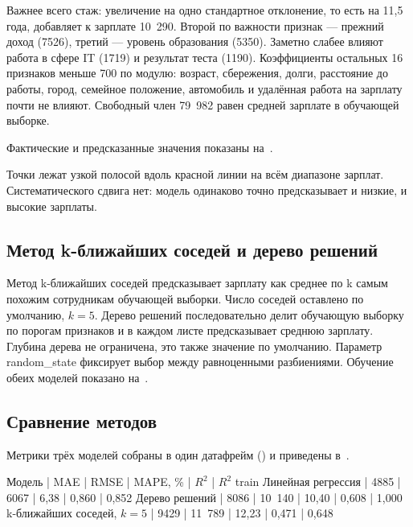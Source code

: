 \documentclass[a4paper,14pt]{extarticle}
\begin{document}
Важнее всего стаж: увеличение на одно стандартное отклонение, то есть на 11,5 года, добавляет к зарплате 10~290. Второй по важности признак — прежний доход (7526), третий — уровень образования (5350). Заметно слабее влияют работа в сфере IT (1719) и результат теста (1190). Коэффициенты остальных 16 признаков меньше 700 по модулю: возраст, сбережения, долги, расстояние до работы, город, семейное положение, автомобиль и удалённая работа на зарплату почти не влияют. Свободный член 79~982 равен средней зарплате в обучающей выборке.

Фактические и предсказанные значения показаны на~.


Точки лежат узкой полосой вдоль красной линии на всём диапазоне зарплат. Систематического сдвига нет: модель одинаково точно предсказывает и низкие, и высокие зарплаты.

\subsection{Метод k-ближайших соседей и дерево решений}

Метод k-ближайших соседей предсказывает зарплату как среднее по k самым похожим сотрудникам обучающей выборки. Число соседей оставлено по умолчанию, $k = 5$. Дерево решений последовательно делит обучающую выборку по порогам признаков и в каждом листе предсказывает среднюю зарплату. Глубина дерева не ограничена, это также значение по умолчанию. Параметр random\_state фиксирует выбор между равноценными разбиениями. Обучение обеих моделей показано на~.


\subsection{Сравнение методов}

Метрики трёх моделей собраны в один датафрейм () и приведены в~.


Модель | MAE | RMSE | MAPE, \% | $R^2$ | $R^2$ train
Линейная регрессия | 4885 | 6067 | 6,38 | 0,860 | 0,852
Дерево решений | 8086 | 10~140 | 10,40 | 0,608 | 1,000
k-ближайших соседей, $k = 5$ | 9429 | 11~789 | 12,23 | 0,471 | 0,648
\end{document}
